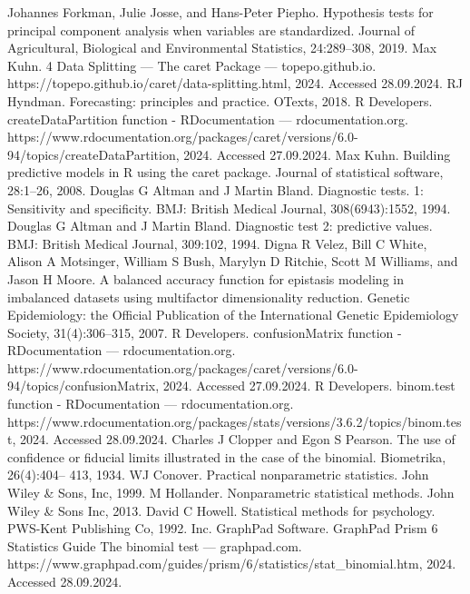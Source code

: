 \documentclass[preprint,12pt]{elsarticle}
\begin{document}
\begin{thebibliography}{000}
 Johannes Forkman, Julie Josse, and Hans-Peter Piepho. Hypothesis tests for principal component analysis when variables are standardized. Journal of Agricultural, Biological and Environmental Statistics, 24:289–308, 2019. 
 Max Kuhn. 4 Data Splitting — The caret Package — topepo.github.io. https://topepo.github.io/caret/data-splitting.html, 2024. Accessed 28.09.2024. 
 RJ Hyndman. Forecasting: principles and practice. OTexts, 2018. 
 R Developers. createDataPartition function - RDocumentation — rdocumentation.org. https://www.rdocumentation.org/packages/caret/versions/6.0-94/topics/createDataPartition, 2024. Accessed 27.09.2024. 
 Max Kuhn. Building predictive models in R using the caret package. Journal of statistical software, 28:1–26, 2008. 
 Douglas G Altman and J Martin Bland. Diagnostic tests. 1: Sensitivity and specificity. BMJ: British Medical Journal, 308(6943):1552, 1994. 
 Douglas G Altman and J Martin Bland. Diagnostic test 2: predictive values. BMJ: British Medical Journal, 309:102, 1994. 
 Digna R Velez, Bill C White, Alison A Motsinger, William S Bush, Marylyn D Ritchie, Scott M Williams, and Jason H Moore. A balanced accuracy function for epistasis modeling in imbalanced datasets using multifactor dimensionality reduction. Genetic Epidemiology: the Official Publication of the International Genetic Epidemiology Society, 31(4):306–315, 2007. 
 R Developers. confusionMatrix function - RDocumentation — rdocumentation.org. https://www.rdocumentation.org/packages/caret/versions/6.0-94/topics/confusionMatrix, 2024. Accessed 27.09.2024. 
 R Developers. binom.test function - RDocumentation — rdocumentation.org. https://www.rdocumentation.org/packages/stats/versions/3.6.2/topics/binom.test, 2024. Accessed 28.09.2024. 
 Charles J Clopper and Egon S Pearson. The use of confidence or fiducial limits illustrated in the case of the binomial. Biometrika, 26(4):404– 413, 1934. 
 WJ Conover. Practical nonparametric statistics. John Wiley & Sons, Inc, 1999. 
 M Hollander. Nonparametric statistical methods. John Wiley & Sons Inc, 2013. 
 David C Howell. Statistical methods for psychology. PWS-Kent Publishing Co, 1992. 
 Inc. GraphPad Software. GraphPad Prism 6 Statistics Guide The binomial test — graphpad.com. https://www.graphpad.com/guides/prism/6/statistics/stat_binomial.htm, 2024. Accessed 28.09.2024. 

\end{thebibliography}
\end{document}
